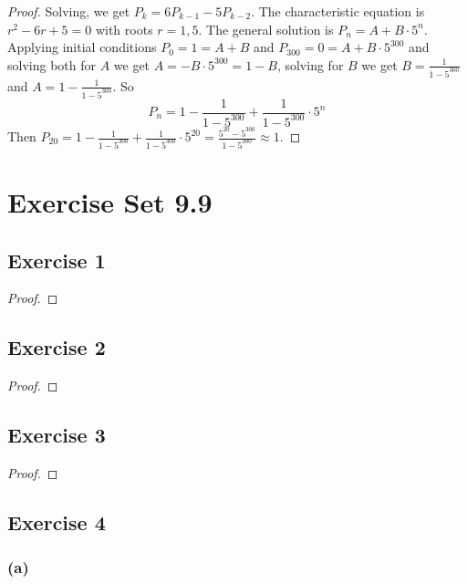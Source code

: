 \documentclass[14pt]{extarticle}
\newcommand{\dps}{\displaystyle}
\begin{document}
\begin{proof}
Solving, we get \(P_k = 6P_{k-1} - 5P_{k-2}\). The characteristic equation is \(r^2 - 6r + 5 = 0\) with roots
\(r = 1,5\). The general solution is \(P_n = A+B \cdot 5^n\). Applying initial conditions \(P_0 = 1 = A + B\) and \(P_{300}
= 0 = A + B \cdot 5^{300}\) and solving both for \(A\) we get \(A = -B \cdot 5^{300} = 1-B\), solving for \(B\) we get 
\(\dps B = \frac{1}{1-5^{300}}\) and \(\dps A = 1 - \frac{1}{1-5^{300}}\). So
\[
P_n = 1 - \frac{1}{1-5^{300}} + \frac{1}{1-5^{300}} \cdot 5^n
\]
Then \(\dps P_{20}=1-\frac{1}{1-5^{300}} + \frac{1}{1-5^{300}} \cdot 5^{20} = \frac{5^{20}-5^{300}}{1-5^{300}} \approx 1\).
\end{proof}

\section{Exercise Set 9.9}

\subsection{Exercise 1}

\begin{proof}

\end{proof}

\subsection{Exercise 2}

\begin{proof}

\end{proof}

\subsection{Exercise 3}

\begin{proof}

\end{proof}

\subsection{Exercise 4}

\subsubsection{(a)}
\end{document}

